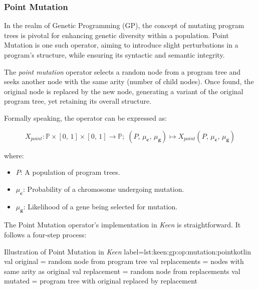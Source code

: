 \subsubsection{Point Mutation}
\label{sec:keen:gp:op:mutation:point}

  In the realm of Genetic Programming (GP), the concept of mutating program trees is pivotal for enhancing genetic diversity within a population. Point Mutation is one such operator, aiming to introduce slight perturbations in a program's structure, while ensuring its syntactic and semantic integrity.

  \begin{definition}
    The \textit{point mutation} operator selects a random node from a program tree and seeks another node with the same arity (number of child nodes). Once found, the original node is replaced by the new node, generating a variant of the original program tree, yet retaining its overall structure.

    Formally speaking, the operator can be expressed as:

    \begin{equation}
      X_{point}: \mathbb{P} \times [0,\, 1] \times [0,\, 1] \to \mathbb{P};\;
        (P,\, \mu_\textbf{c},\, \mu_\textbf{g}) 
        \mapsto X_{point}(P,\, \mu_\textbf{c},\, \mu_\textbf{g})
    \end{equation}

    where:

    \begin{itemize}
      \item \(P\): A population of program trees.
      \item \(\mu_\textbf{c}\): Probability of a chromosome undergoing mutation.
      \item \(\mu_\textbf{g}\): Likelihood of a gene being selected for mutation.
    \end{itemize}
  \end{definition}

  The Point Mutation operator's implementation in \textit{Keen} is straightforward. It follows a four-step process:

  \begin{code}{
    Illustration of Point Mutation in \textit{Keen}
  }{label=lst:keen:gp:op:mutation:point}{kotlin}
    val original = random node from program tree
    val replacements = nodes with same arity as original
    val replacement = random node from replacements
    val mutated = program tree with original replaced by replacement
  \end{code}

